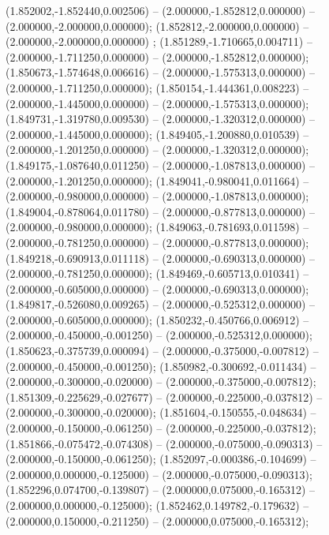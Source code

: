  (1.852002,-1.852440,0.002506) -- (2.000000,-1.852812,0.000000) -- (2.000000,-2.000000,0.000000);
 (1.852812,-2.000000,0.000000) -- (2.000000,-2.000000,0.000000) ;
 (1.851289,-1.710665,0.004711) -- (2.000000,-1.711250,0.000000) -- (2.000000,-1.852812,0.000000);
 (1.850673,-1.574648,0.006616) -- (2.000000,-1.575313,0.000000) -- (2.000000,-1.711250,0.000000);
 (1.850154,-1.444361,0.008223) -- (2.000000,-1.445000,0.000000) -- (2.000000,-1.575313,0.000000);
 (1.849731,-1.319780,0.009530) -- (2.000000,-1.320312,0.000000) -- (2.000000,-1.445000,0.000000);
 (1.849405,-1.200880,0.010539) -- (2.000000,-1.201250,0.000000) -- (2.000000,-1.320312,0.000000);
 (1.849175,-1.087640,0.011250) -- (2.000000,-1.087813,0.000000) -- (2.000000,-1.201250,0.000000);
 (1.849041,-0.980041,0.011664) -- (2.000000,-0.980000,0.000000) -- (2.000000,-1.087813,0.000000);
 (1.849004,-0.878064,0.011780) -- (2.000000,-0.877813,0.000000) -- (2.000000,-0.980000,0.000000);
 (1.849063,-0.781693,0.011598) -- (2.000000,-0.781250,0.000000) -- (2.000000,-0.877813,0.000000);
 (1.849218,-0.690913,0.011118) -- (2.000000,-0.690313,0.000000) -- (2.000000,-0.781250,0.000000);
 (1.849469,-0.605713,0.010341) -- (2.000000,-0.605000,0.000000) -- (2.000000,-0.690313,0.000000);
 (1.849817,-0.526080,0.009265) -- (2.000000,-0.525312,0.000000) -- (2.000000,-0.605000,0.000000);
 (1.850232,-0.450766,0.006912) -- (2.000000,-0.450000,-0.001250) -- (2.000000,-0.525312,0.000000);
 (1.850623,-0.375739,0.000094) -- (2.000000,-0.375000,-0.007812) -- (2.000000,-0.450000,-0.001250);
 (1.850982,-0.300692,-0.011434) -- (2.000000,-0.300000,-0.020000) -- (2.000000,-0.375000,-0.007812);
 (1.851309,-0.225629,-0.027677) -- (2.000000,-0.225000,-0.037812) -- (2.000000,-0.300000,-0.020000);
 (1.851604,-0.150555,-0.048634) -- (2.000000,-0.150000,-0.061250) -- (2.000000,-0.225000,-0.037812);
 (1.851866,-0.075472,-0.074308) -- (2.000000,-0.075000,-0.090313) -- (2.000000,-0.150000,-0.061250);
 (1.852097,-0.000386,-0.104699) -- (2.000000,0.000000,-0.125000) -- (2.000000,-0.075000,-0.090313);
 (1.852296,0.074700,-0.139807) -- (2.000000,0.075000,-0.165312) -- (2.000000,0.000000,-0.125000);
 (1.852462,0.149782,-0.179632) -- (2.000000,0.150000,-0.211250) -- (2.000000,0.075000,-0.165312);
